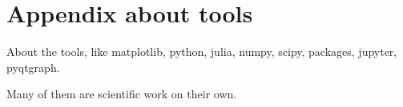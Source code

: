 \chapter{Appendix about tools}
\label{ch:tools_appendix}

About the tools, like matplotlib, python, julia, numpy, scipy, packages, jupyter, pyqtgraph.

Many of them are scientific work on their own.